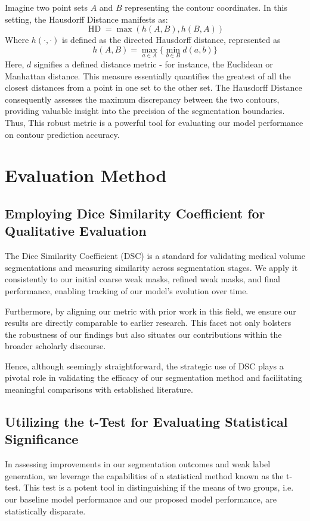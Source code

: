 Imagine two point sets \(A\) and \(B\) representing the contour coordinates. In this setting, the Hausdorff Distance manifests as:
\[
\operatorname*{HD} = \max \left(h(A, B), h(B, A)\right)
\]
Where \(h(\cdot, \cdot)\) is defined as the directed Hausdorff distance, represented as
\[
h(A, B) = \max_{a \in A}\{ \min_{b \in B} d(a, b) \}
\]
Here, \(d\) signifies a defined distance metric - for instance, the Euclidean or Manhattan distance. This measure essentially quantifies the greatest of all the closest distances from a point in one set to the other set. The Hausdorff Distance consequently assesses the maximum discrepancy between the two contours, providing valuable insight into the precision of the segmentation boundaries. Thus, This robust metric is a powerful tool for evaluating our model performance on contour prediction accuracy.
\section{Evaluation Method}
\subsection{Employing Dice Similarity Coefficient for Qualitative Evaluation}
The Dice Similarity Coefficient (DSC) is a standard for validating medical volume segmentations and measuring similarity across segmentation stages. We apply it consistently to our initial coarse weak masks, refined weak masks, and final performance, enabling tracking of our model's evolution over time.

Furthermore, by aligning our metric with prior work in this field, we ensure our results are directly comparable to earlier research. This facet not only bolsters the robustness of our findings but also situates our contributions within the broader scholarly discourse.

Hence, although seemingly straightforward, the strategic use of DSC plays a pivotal role in validating the efficacy of our segmentation method and facilitating meaningful comparisons with established literature.
\subsection{Utilizing the t-Test for Evaluating Statistical Significance}
In assessing improvements in our segmentation outcomes and weak label generation, we leverage the capabilities of a statistical method known as the t-test. This test is a potent tool in distinguishing if the means of two groups, i.e. our baseline model performance and our proposed model performance, are statistically disparate.

